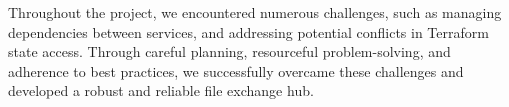 \documentclass[a4paper,fleqn]{cas-sc}
\begin{document}
Throughout the project, we encountered numerous challenges, such as managing dependencies between services, and addressing potential conflicts in Terraform state access. Through careful planning, resourceful problem-solving, and adherence to best practices, we successfully overcame these challenges and developed a robust and reliable file exchange hub.

%
%
%


\end{document}
